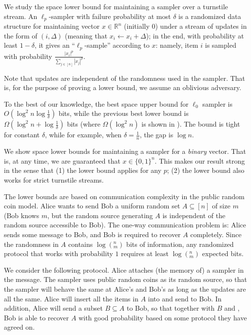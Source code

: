\bigskip
\bigskip
\bigskip

We study the space lower bound for maintaining a sampler over a turnstile stream. An $\ell_p$-sampler with failure probability at most $\delta$ is a randomized data structure for maintaining vector $x\in \mathbb{R}^n$ (initially 0) under a stream of updates in the form of $(i, \Delta)$ (meaning that $x_i \leftarrow x_i+\Delta$); in the end, with probability at least $1-\delta$, it gives an ``$\ell_p$-sample'' according to $x$: namely, item $i$ is sampled with probability $\frac{|x_i|^p}{\sum_{j\in [n]}{|x_j|^p}}$. 

Note that updates are independent of the randomness used in the sampler. That is, for the purpose of proving a lower bound, we assume an oblivious adversary. 

To the best of our knowledge, the best space upper bound for $\ell_0$ sampler is $O(\log^2 n \log \frac{1}{\delta})$ bits, while the previous best lower bound is $\Omega(\log^2 n +\log\frac{1}{\delta})$ bits (where $\Omega(\log^2 n)$ is shown in \cite{JowhariST11}). The bound is tight for constant $\delta$, while for example, when $\delta=\frac{1}{n}$, the gap is $\log n$. 

We show space lower bounds for maintaining a sampler for a {\em binary} vector. That is, at any time, we are guaranteed that $x\in \{0,1\}^n$. This makes our result strong in the sense that (1) the lower bound applies for any $p$; (2) the lower bound also works for strict turnstile streams.

The lower bounds are based on communication complexity in the public random coin model. Alice wants to send Bob a uniform random set $A\subseteq [n]$ of size $m$ (Bob knows $m$, but the random source generating $A$ is independent of the random source accessible to Bob). The one-way communication problem is: Alice sends some message to Bob, and Bob is required to recover $A$ completely. Since the randomness in $A$ contains $\log (^n_m)$ bits of information, any randomized protocol that works with probability $1$ requires at least $\log (^n_m)$ expected bits. 

We consider the following protocol. Alice attaches (the memory of) a sampler \samp in the message. The sampler uses public random coins as its random source, so that the sampler will behave the same at Alice's and Bob's as long as the updates are all the same. Alice will insert all the items in $A$ into \samp and send \samp to Bob. In addition, Alice will send a subset $B\subseteq A$ to Bob, so that together with $B$ and \samp, Bob is able to recover $A$ with good probability based on some protocol they have agreed on. 
 
